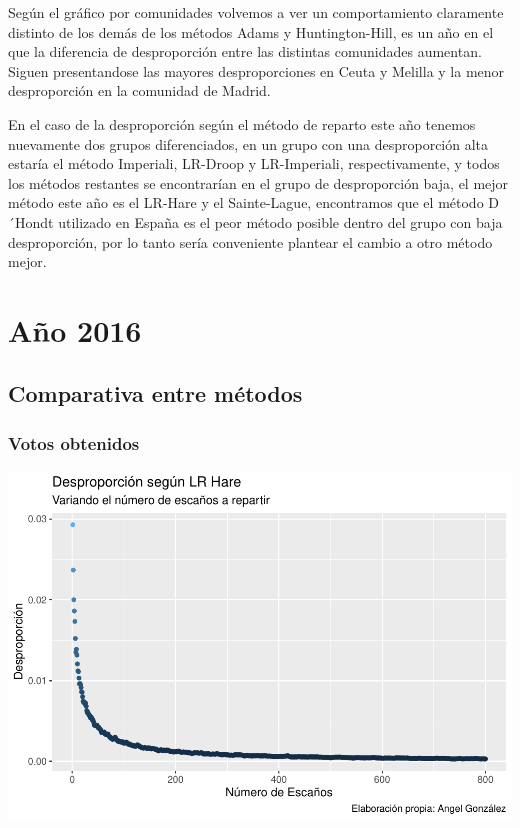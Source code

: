 \documentclass[12pt,a4paper,]{book}
\numberwithin{dummy}{section}
\theoremstyle{ocrenumbox}
\theoremstyle{blacknumex}
\theoremstyle{blacknumbox}
\theoremstyle{ocrenum}
\theoremstyle{ocrenum}
\begin{document}
Según el gráfico por comunidades volvemos a ver un comportamiento
claramente distinto de los demás de los métodos Adams y Huntington-Hill,
es un año en el que la diferencia de desproporción entre las distintas
comunidades aumentan. Siguen presentandose las mayores desproporciones
en Ceuta y Melilla y la menor desproporción en la comunidad de Madrid.

En el caso de la desproporción según el método de reparto este año
tenemos nuevamente dos grupos diferenciados, en un grupo con una
desproporción alta estaría el método Imperiali, LR-Droop y LR-Imperiali,
respectivamente, y todos los métodos restantes se encontrarían en el
grupo de desproporción baja, el mejor método este año es el LR-Hare y el
Sainte-Lague, encontramos que el método D´Hondt utilizado en España es
el peor método posible dentro del grupo con baja desproporción, por lo
tanto sería conveniente plantear el cambio a otro método mejor.

\hypertarget{auxf1o-2016}{%
\section{Año 2016}\label{auxf1o-2016}}

\hypertarget{comparativa-entre-muxe9todos-12}{%
\subsection{Comparativa entre
métodos}\label{comparativa-entre-muxe9todos-12}}

\hypertarget{votos-obtenidos-12}{%
\subsubsection{Votos obtenidos}\label{votos-obtenidos-12}}

\begin{center}\includegraphics[width=1\linewidth]{figurasR/unnamed-chunk-41-1} \end{center}
\end{document}
